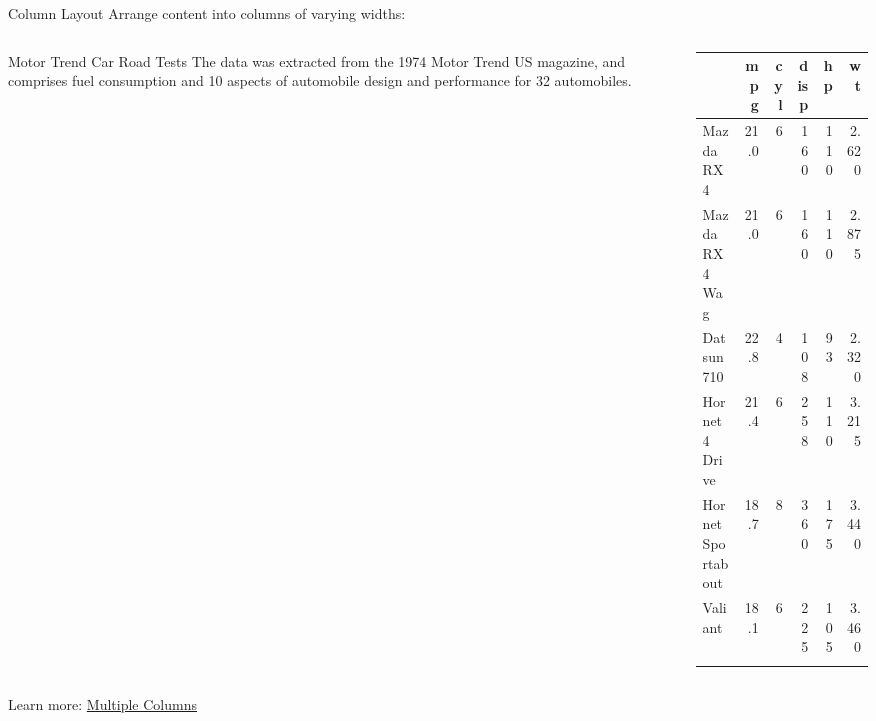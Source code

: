 \documentclass[10pt, aspectratio=1610]{beamer}
\begin{document}
\begin{frame}{Column Layout}
\protect{}\label{column-layout}
Arrange content into columns of varying widths:

\begin{columns}[T]
\begin{column}{0.35\linewidth}
\begin{block}{Motor Trend Car Road Tests}
\protect{}\label{motor-trend-car-road-tests}
The data was extracted from the 1974 Motor Trend US magazine, and
comprises fuel consumption and 10 aspects of automobile design and
performance for 32 automobiles.
\end{block}
\end{column}

\begin{column}{0.03\linewidth}
\end{column}

\begin{column}{0.62\linewidth}
{\def\LTcaptype{none} %
\begin{longtable}[]{@{}lrrrrr@{}}
\toprule\noalign{}
& mpg & cyl & disp & hp & wt \\
\midrule\noalign{}
\endhead
Mazda RX4 & 21.0 & 6 & 160 & 110 & 2.620 \\
Mazda RX4 Wag & 21.0 & 6 & 160 & 110 & 2.875 \\
Datsun 710 & 22.8 & 4 & 108 & 93 & 2.320 \\
Hornet 4 Drive & 21.4 & 6 & 258 & 110 & 3.215 \\
Hornet Sportabout & 18.7 & 8 & 360 & 175 & 3.440 \\
Valiant & 18.1 & 6 & 225 & 105 & 3.460 \\
\bottomrule\noalign{}
\end{longtable}
}
\end{column}
\end{columns}

Learn more:
\href{https://quarto.org/docs/presentations/revealjs/\#multiple-columns}{Multiple
Columns}
\end{frame}
\end{document}
